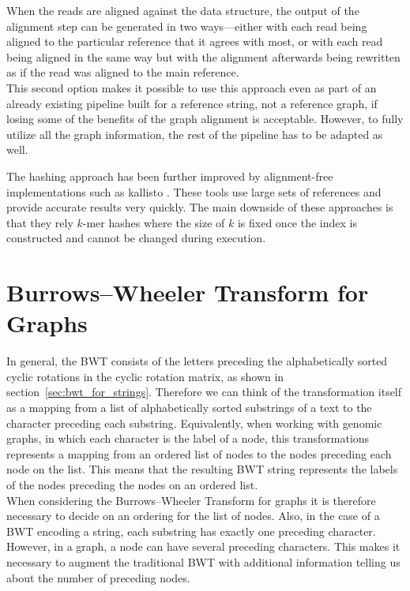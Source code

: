 \documentclass[a4paper,12pt,twoside,BCOR=10mm]{scrbook}
\begin{document}
When the reads are aligned against the data structure, the output of the alignment step
can be generated in two ways---either with each read being aligned to the particular reference
that it agrees with most, or with each read being aligned in the same way but with the
alignment afterwards being rewritten as if the read was aligned to the main reference. \\
This second option makes it possible to use this approach even as part of an already existing pipeline
built for a reference string, not a reference graph, if losing some of the benefits of
the graph alignment is acceptable. However, to fully utilize all the graph information,
the rest of the pipeline has to be adapted as well.

The hashing approach has been further improved by alignment-free implementations such as
kallisto \citep{Bray2015}.
These tools use large sets of references and provide accurate results very quickly.
The main downside of these approaches is that they rely $ k $-mer hashes
where the size of $ k $ is fixed once the index is constructed and cannot be changed during execution.

\section{Burrows--Wheeler Transform for Graphs}

In general, the BWT consists of the letters preceding the alphabetically sorted cyclic rotations
in the cyclic rotation matrix, as shown in section~\ref{sec:bwt_for_strings}.
Therefore we can think of the transformation itself as a mapping from a list of alphabetically
sorted substrings of a text to the character preceding each substring.
Equivalently, when working with genomic graphs, in which each character is the label
of a node, this transformations represents a mapping from an ordered list of nodes
to the nodes preceding each node on the list.
This means that the resulting BWT string represents the labels of the nodes
preceding the nodes on an ordered list. \\
When considering the Burrows--Wheeler Transform for graphs it is therefore necessary
to decide on an ordering for the list of nodes.
Also, in the case of a BWT encoding a string, each substring has exactly one preceding character.
However, in a graph, a node can have several preceding characters.
This makes it necessary to augment the traditional BWT with additional information telling
us about the number of preceding nodes.
\end{document}
